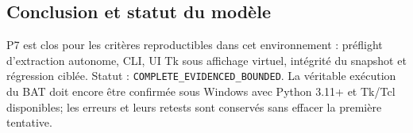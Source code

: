 \documentclass[11pt,a4paper]{article}
\begin{document}
\subsection{Conclusion et statut du modèle}
P7 est clos pour les critères reproductibles dans cet environnement : préflight d'extraction autonome, CLI, UI Tk sous affichage virtuel, intégrité du snapshot et régression ciblée. Statut : \texttt{COMPLETE\_EVIDENCED\_BOUNDED}. La véritable exécution du BAT doit encore être confirmée sous Windows avec Python 3.11+ et Tk/Tcl disponibles; les erreurs et leurs retests sont conservés sans effacer la première tentative.
\end{document}
